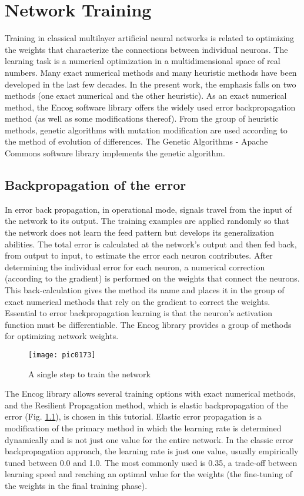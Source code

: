 \newpage
\chapter{Network Training}
\label{chapter07}

Training in classical multilayer artificial neural networks is related to optimizing the weights that characterize the connections between individual neurons. The learning task is a numerical optimization in a multidimensional space of real numbers. Many exact numerical methods and many heuristic methods have been developed in the last few decades. In the present work, the emphasis falls on two methods (one exact numerical and the other heuristic). As an exact numerical method, the Encog software library offers the widely used error backpropagation method (as well as some modifications thereof). From the group of heuristic methods, genetic algorithms with mutation modification are used according to the method of evolution of differences. The Genetic Algorithms - Apache Commons software library implements the genetic algorithm.

\section{Backpropagation of the error}

In error back propagation, in operational mode, signals travel from the input of the network to its output. The training examples are applied randomly so that the network does not learn the feed pattern but develops its generalization abilities. The total error is calculated at the network's output and then fed back, from output to input, to estimate the error each neuron contributes. After determining the individual error for each neuron, a numerical correction (according to the gradient) is performed on the weights that connect the neurons. This back-calculation gives the method its name and places it in the group of exact numerical methods that rely on the gradient to correct the weights. Essential to error backpropagation learning is that the neuron's activation function must be differentiable. The Encog library provides a group of methods for optimizing network weights.

\begin{figure}[h]
\centering
\texttt{[image: pic0173]}
\caption{A single step to train the network}
\label{fig:pic0173}
\end{figure}
\FloatBarrier

The Encog library allows several training options with exact numerical methods, and the Resilient Propagation method, which is elastic backpropagation of the error (Fig. \ref{fig:pic0173}), is chosen in this tutorial. Elastic error propagation is a modification of the primary method in which the learning rate is determined dynamically and is not just one value for the entire network. In the classic error backpropagation approach, the learning rate is just one value, usually empirically tuned between 0.0 and 1.0. The most commonly used is 0.35, a trade-off between learning speed and reaching an optimal value for the weights (the fine-tuning of the weights in the final training phase).

